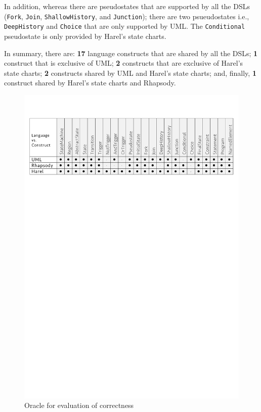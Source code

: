In addition, whereas there are pseudostates that are supported by all the DSLs (\texttt{Fork}, \texttt{Join}, \texttt{ShallowHistory}, and \texttt{Junction}); there are two psueudostates i.e., \texttt{DeepHistory} and \texttt{Choice} that are only supported by UML. The \texttt{Conditional} pseudostate is only provided by Harel's state charts.

In summary, there are: \textbf{17} language constructs that are shared by all the DSLs; \textbf{1} construct that is exclusive of UML; \textbf{2} constructs that are exclusive of Harel's state charts; \textbf{2} constructs shared by UML and Harel's state charts; and, finally, \textbf{1} construct shared by Harel's state charts and Rhapsody. 

\begin{figure}
\centering
\includegraphics[width=1\linewidth]{images/oracle.pdf}
\caption{Oracle for evaluation of correctness}
\label{fig:oracle}
\end{figure}

